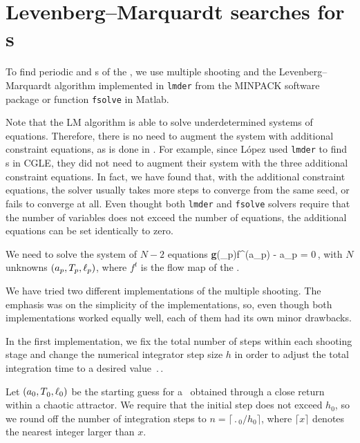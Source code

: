 
\section{Levenberg--Marquardt searches for \rpo s}
\label{sec:lmderRLD}

To find periodic and \rpo s of the \KSe , we use multiple shooting and
the Levenberg--Marquardt algorithm implemented in {\tt lmder} from
the MINPACK software package or function {\tt fsolve} in Matlab.

Note that the LM algorithm is able to solve underdetermined systems of
equations.  Therefore, there is no need to augment the system with
additional constraint equations, as is done in .
For example, since L{\'o}pez {\etal} used {\tt lmder} to
find \rpo s in CGLE, they did not need to augment their system with the
three additional constraint equations.  In fact, we have found that,
with the additional constraint equations, the solver usually takes more
steps to converge from the same seed, or fails to converge at all. Even
thought both {\tt lmder} and {\tt fsolve} solvers require that the
number of variables does not exceed the number of equations, the
additional equations can be set identically to zero.

We need to solve the system of $N-2$ equations
\beq
  {\bf g}(\shift_p)f^(a_p) - a_p = 0\,,
with $N$ unknowns $(a_p, {T_{p}}, \ell_p)$, where $f^t$
is the flow map of the \KSe.

We have tried two different implementations of the multiple shooting.
The emphasis was on the simplicity of the implementations, so, even
though both implementations worked equally well, each of them had
its own minor drawbacks.

In the first implementation, we fix the total number of steps within
each shooting stage and change the numerical integrator step size
$h$ in order to adjust the total integration time to a desired value
$\period{}$.

Let $(a_0, {T_{}}_0, \ell_0)$ be the starting guess for a \rpo\
obtained through a close return within a chaotic attractor.  We
require that the initial step does not exceed $h_0$, so we round off the
number of integration steps to $n = \lceil \period{}_0/h_0\rceil$, where
$\lceil x \rceil$ denotes the nearest integer larger than $x$.

